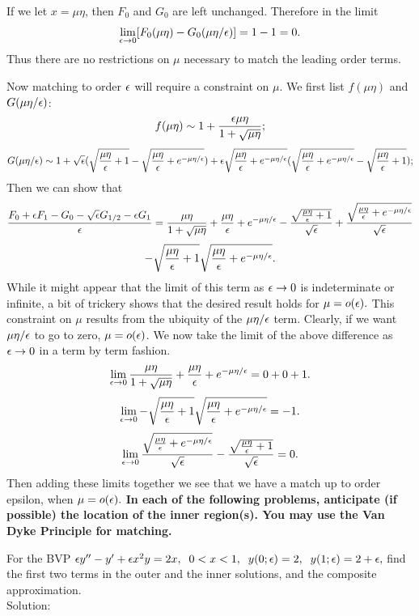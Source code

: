 \item If we let $x=\mu\eta$, then $F_0$ and $G_0$ are left unchanged. Therefore in the limit
$$\lim_{\epsilon\to 0}[F_0(\mu\eta)-G_0(\mu\eta/\epsilon)]=1-1=0.$$
Thus there are no restrictions on $\mu$ necessary to match the leading order terms.

\item Now matching to order $\epsilon$ will require a constraint on $\mu.$ We first list $f(\mu\eta)$ and $G(\mu\eta/\epsilon)$:
    $$f(\mu\eta)\sim1+\frac{\epsilon\mu\eta}{1+\sqrt{\mu\eta}};$$
    $$G(\mu\eta/\epsilon)\sim1+\sqrt{\epsilon}(\sqrt{\frac{\mu\eta}{\epsilon}+1}-\sqrt{\frac{\mu\eta}{\epsilon}+e^{-\mu\eta/\epsilon}})+\epsilon\sqrt{\frac{\mu\eta}{\epsilon}+e^{-\mu\eta/\epsilon}}(\sqrt{\frac{\mu\eta}{\epsilon}+e^{-\mu\eta/\epsilon}}-\sqrt{\frac{\mu\eta}{\epsilon}+1});$$
    Then we can show that
    \pagebreak
    $$\frac{F_0+\epsilon F_1-G_0-\sqrt{\epsilon}G_{1/2}-\epsilon G_1}{\epsilon}=\frac{\mu\eta}{1+\sqrt{\mu\eta}}+\frac{\mu\eta}{\epsilon}+e^{-\mu\eta/\epsilon}-\frac{\sqrt{\frac{\mu\eta}{\epsilon}+1}}{\sqrt{\epsilon}}+\frac{\sqrt{\frac{\mu\eta}{\epsilon}+e^{-\mu\eta/\epsilon}}}{\sqrt{\epsilon}}$$
    $$-\sqrt{\frac{\mu\eta}{\epsilon}+1}\sqrt{\frac{\mu\eta}{\epsilon}+e^{-\mu\eta/\epsilon}}.$$
    While it might appear that the limit of this term as $\epsilon\to 0$ is indeterminate or infinite, a bit of trickery shows that the desired result holds for $\mu=o(\epsilon).$ This constraint on $\mu$ results from the ubiquity of the $\mu\eta/\epsilon$ term. Clearly, if we want $\mu\eta/\epsilon$ to go to zero, $\mu=o(\epsilon)$. We now take the limit of the above difference as $\epsilon\to 0$ in a term by term fashion.
    $$\lim_{\epsilon\to 0}\frac{\mu\eta}{1+\sqrt{\mu\eta}}+\frac{\mu\eta}{\epsilon}+e^{-\mu\eta/\epsilon}=0+0+1.$$
    $$\lim_{\epsilon\to 0}-\sqrt{\frac{\mu\eta}{\epsilon}+1}\sqrt{\frac{\mu\eta}{\epsilon}+e^{-\mu\eta/\epsilon}}=-1.$$
    $$\lim_{\epsilon\to 0}\frac{\sqrt{\frac{\mu\eta}{\epsilon}+e^{-\mu\eta/\epsilon}}}{\sqrt{\epsilon}}-\frac{\sqrt{\frac{\mu\eta}{\epsilon}+1}}{\sqrt{\epsilon}}=0.$$
    Then adding these limits together we see that we have a match up to order epsilon, when $\mu=o(\epsilon).$
\eenum
\bigskip
{\bf In each of the following problems, anticipate (if possible) the location of the inner region(s).  You may use the Van Dyke Principle for matching.}

\item For the BVP $\epsilon y'' - y' + \epsilon x^2 y = 2x,\;\; 0<x<1,\;\; y(0;\epsilon)=2,\;\; y(1;\epsilon)=2+\epsilon,$  find the first two terms in the outer and the inner solutions, and the composite approximation.\\

    Solution:\\

